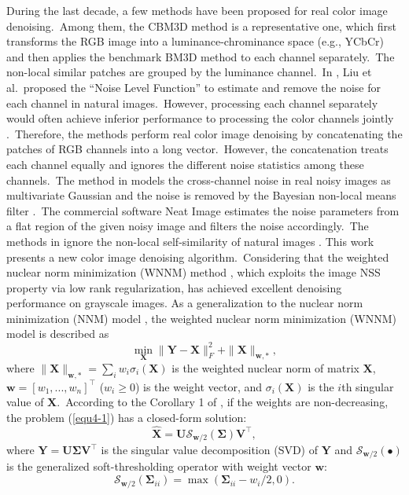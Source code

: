 During the last decade, a few methods have been proposed for real color image denoising.\ Among them, the CBM3D method \cite{cbm3d} is a representative one, which first transforms the RGB image into a luminance-chrominance space (e.g., YCbCr) and then applies the benchmark BM3D method \cite{bm3d} to each channel separately.\ The non-local similar patches are grouped by the luminance channel.\ In \cite{Liu2008}, Liu et al.\ proposed the ``Noise Level Function'' to estimate and remove the noise for each channel in natural images.\ However, processing each channel separately would often achieve inferior performance to processing the color channels jointly \cite{mairal2008sparse}.\ Therefore, the methods \cite{noiseclinic,ncwebsite,Zhu_2016_CVPR} perform real color image denoising by concatenating the patches of RGB channels into a long vector.\ However, the concatenation treats each channel equally and ignores the different noise statistics among these channels.\ The method in \cite{crosschannel2016} models the cross-channel noise in real noisy images as multivariate Gaussian and the noise is removed by the Bayesian non-local means filter \cite{kervrann2007bayesian}.\ The commercial software Neat Image \cite{neatimage} estimates the noise parameters from a flat region of the given noisy image and filters the noise accordingly.\ The methods in \cite{crosschannel2016,neatimage} ignore the non-local self-similarity of natural images \cite{bm3d,wnnm}. 
This work presents a new color image denoising algorithm.\ Considering that the weighted nuclear norm minimization (WNNM) method \cite{wnnm,wnnmijcv}, which exploits the image NSS property via low rank regularization, has achieved excellent denoising performance on grayscale images. As a generalization to the nuclear norm minimization (NNM) model \cite{cai2010singular}, the weighted nuclear norm minimization (WNNM) model \cite{wnnm,wnnmijcv} is described as 
\begin{equation}
\label{equ4-1}
\min_{\mathbf{X}}\|\mathbf{Y}-\mathbf{X}\|_{F}^{2}
+
\|\mathbf{X}\|_{\bm{w},*},
\end{equation}
where $\|\mathbf{X}\|_{\bm{w},*}=\sum_{i}w_{i}\sigma_{i}(\mathbf{X})$ is the weighted nuclear norm of matrix $\mathbf{X}$, $\bm{w}=[w_{1},...,w_{n}]^{\top}$ ($w_{i}\ge 0$) is the weight vector, and $\sigma_{i}(\mathbf{X})$ is the $i$th singular value of $\mathbf{X}$.\ According to the Corollary 1 of \cite{wnnmijcv}, if the weights are non-decreasing, the problem (\ref{equ4-1}) has a closed-form solution: 
\begin{equation}
\label{equ4-2}
\mathbf{\hat{X}}
=
\mathbf{U}
\mathcal{S}_{\bm{w}/2}
(\mathbf{\Sigma})
\mathbf{V}^{\top},
\end{equation}
where $\mathbf{Y}=\mathbf{U}\mathbf{\Sigma}\mathbf{V}^{\top}$ is the singular value decomposition (SVD) \cite{eckart1936approximation} of $\mathbf{Y}$ and 
$\mathcal{S}_{\bm{w}/2}(\bullet)$ is the generalized soft-thresholding operator with weight vector $\bm{w}$:
\begin{equation}
\label{equ4-3}
\mathcal{S}_{\bm{w}/2}
(\mathbf{\Sigma}_{ii})
=
\max(\mathbf{\Sigma}_{ii}-w_{i}/2, 0).
\end{equation}

